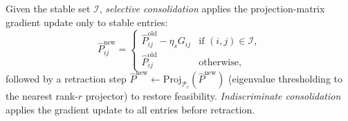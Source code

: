 \begin{definition}
\label{def:selective-consolidation}
Given the stable set $\mathcal{I}$, \emph{selective consolidation}
applies the projection-matrix gradient update only to stable entries:
\[
  \hat{P}^{\mathrm{new}}_{ij} =
  \begin{cases}
    \hat{P}^{\mathrm{old}}_{ij} - \eta_s G_{ij}
      & \text{if } (i,j) \in \mathcal{I}, \\
    \hat{P}^{\mathrm{old}}_{ij}
      & \text{otherwise},
  \end{cases}
\]
followed by a retraction step $\hat{P}^{\mathrm{new}} \gets
\mathrm{Proj}_{\mathcal{P}_r}(\hat{P}^{\mathrm{new}})$ (eigenvalue
thresholding to the nearest rank-$r$ projector) to restore feasibility.
\emph{Indiscriminate consolidation} applies the gradient update to all
entries before retraction.
\end{definition}

